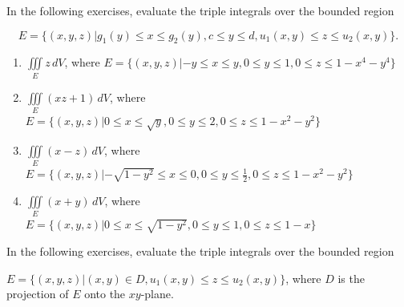 \documentclass{exercises}
\begin{document}
In the following exercises, evaluate the triple integrals over the bounded region


\[E=\{(x,y,z)|g_{1}(y)\le x\le g_{2}(y),c\le y\le d,u_{1}(x,y)\le z\le u_{2}(x,y)\}.\]

\begin{enumerate}[resume]
\item $\underset{E}{\iiint}z\,dV$, where $E=\{(x,y,z)|-y\le x\le y,0\le y\le1,0\le z\le1-x^{4}-y^{4}\}$
\item $\underset{E}{\iiint}(xz+1)\,dV$, where $E=\{(x,y,z)|0\le x\le \sqrt{y},0\le y\le2,0\le z\le1-x^{2}-y^{2}\}$
\item $\underset{E}{\iiint}(x-z)\,dV$, where $E=\{(x,y,z)|-\sqrt{1-y^{2}}\le x\le0,0\le y\le \frac{1}{2},0\le z\le1-x^{2}-y^{2}\}$
\item $\underset{E}{\iiint}(x+y)\,dV$, where $E=\{(x,y,z)|0\le x\le \sqrt{1-y^{2}},0\le y\le1,0\le z\le1-x\}$
\end{enumerate}

In the following exercises, evaluate the triple integrals over the bounded region


$E=\{(x,y,z)|(x,y)\in D,u_{1}(x,y)\le z\le u_{2}(x,y)\}$, where $D$ is the projection of $E$ onto the $xy$-plane.
\end{document}
